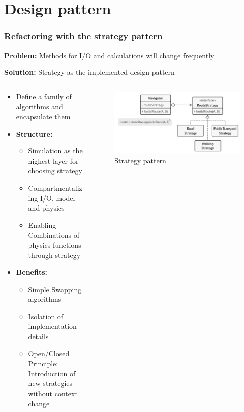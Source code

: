 \section{Design pattern}

\begin{frame}
    \frametitle{Refactoring with the strategy pattern}
    \textbf{Problem:} Methods for I/O and calculations will change frequently

    \textbf{Solution:} Strategy as the implemented design pattern

    \begin{columns}
        \hspace{-25pt}
        \begin{column}{0.55\textwidth}
            \begin{itemize}
                \item Define a family of algorithms and encapsulate them
                \item \textbf{Structure: } 
                \begin{itemize}
                    \item Simulation as the highest layer for choosing strategy
                    \item Compartmentalizing I/O, model and physics
                    \item Enabling Combinations of physics functions through strategy
                \end{itemize}
                \item \textbf{Benefits: }
                \begin{itemize}
                    \item Simple Swapping algorithms
                    \item Isolation of implementation details
                    \item Open/Closed Principle: Introduction of new strategies without context change
                \end{itemize}
            \end{itemize}
        \end{column}
        \begin{column}{0.45\textwidth}
            \begin{figure}
                \includegraphics[width=\columnwidth]{../images/strategy.png}
                \caption{Strategy pattern \cite{StraPattern}}
            \end{figure}
        \end{column}
    \end{columns}

    
\end{frame}